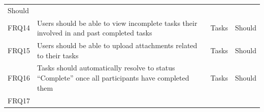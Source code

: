 \documentclass[12pt]{report}
\begin{document}
\begin{longtable}[]{@{}llll@{}}
\begin{minipage}[t]{0.09\columnwidth}
Should\strut
\end{minipage}\tabularnewline
\begin{minipage}[t]{0.04\columnwidth}\raggedright\strut
FRQ14\strut
\end{minipage} & \begin{minipage}[t]{0.64\columnwidth}\raggedright\strut
Users should be able to view incomplete tasks their involved in and past
completed tasks\strut
\end{minipage} & \begin{minipage}[t]{0.12\columnwidth}\raggedright\strut
Tasks\strut
\end{minipage} & \begin{minipage}[t]{0.09\columnwidth}\raggedright\strut
Should\strut
\end{minipage}\tabularnewline
\begin{minipage}[t]{0.04\columnwidth}\raggedright\strut
FRQ15\strut
\end{minipage} & \begin{minipage}[t]{0.64\columnwidth}\raggedright\strut
Users should be able to upload attachments related to their tasks\strut
\end{minipage} & \begin{minipage}[t]{0.12\columnwidth}\raggedright\strut
Tasks\strut
\end{minipage} & \begin{minipage}[t]{0.09\columnwidth}\raggedright\strut
Should\strut
\end{minipage}\tabularnewline
\begin{minipage}[t]{0.04\columnwidth}\raggedright\strut
FRQ16\strut
\end{minipage} & \begin{minipage}[t]{0.64\columnwidth}\raggedright\strut
Tasks should automatically resolve to status ``Complete'' once all
participants have completed them\strut
\end{minipage} & \begin{minipage}[t]{0.12\columnwidth}\raggedright\strut
Tasks\strut
\end{minipage} & \begin{minipage}[t]{0.09\columnwidth}\raggedright\strut
Should\strut
\end{minipage}\tabularnewline
\begin{minipage}[t]{0.04\columnwidth}\raggedright\strut
FRQ17\strut
\end{minipage} & \begin{minipage}[t]{0.64\columnwidth}\raggedright\strut

\end{minipage}
\end{longtable}
\end{document}
